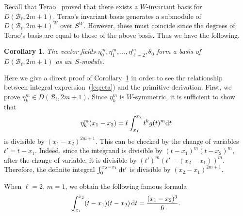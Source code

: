 \documentclass[10pt,a4paper]{amsart}
\numberwithin{equation}{section}
\newtheorem{Corollary}[Theorem]{Corollary}
\newcommand{\B}{\mathcal{B}}
\begin{document}
Recall that Terao~\cite{ter-mult} proved that there exists a $W$-invariant basis
for $D(\B_\ell, 2m+1)$. Terao's invariant basis generates a submodule
of $D(\B_\ell, 2m+1)^W$ over $S^W$. However, these must coincide since
the degrees of Terao's basis are equal to those of the above basis.
Thus we have the following.
\begin{Corollary}
\label{cor:multibasis}
The vector fields
$\eta_0^m, \eta_1^m, \dots, \eta_{\ell-2}^m, \theta_0$ form a
basis of $D(\B_\ell, 2m+1)$ as an~$S$-module.
\end{Corollary}
Here we give a direct proof of Corollary~\ref{cor:multibasis} in order to see
the relationship between integral expression~(\ref{eq:eta}) and
the primitive derivation.
First, we prove $\eta_k^m\in D(\B_\ell, 2m+1)$. Since $\eta_k^m$ is
$W$-symmetric, it is sufficient to show that
\begin{gather*}
\eta_k^m(x_1-x_2)=\ell\int_{x_1}^{x_2}t^kg(t)^m{\rm d}t
\end{gather*}
is divisible by $(x_1-x_2)^{2m+1}$. This can be checked by
the change of variables $t'=t-x_1$.
Indeed, since the integrand is divisible by $(t-x_1)^m(t-x_2)^m$, after the
change of variable, it is divisible by $(t')^m(t'-(x_2-x_1))^m$. Therefore,
the definite integral $\int_0^{x_2-x_1}{\rm d}t'$ is divisible by $(x_2-x_1)^{2m+1}$.

\begin{Example}
When $\ell=2$, $m=1$, we obtain the following famous formula
\begin{gather*}
\int_{x_1}^{x_2}(t-x_1)(t-x_2)\,{\rm d}t=\frac{(x_1-x_2)^3}{6}.
\end{gather*}
\end{Example}
\end{document}
